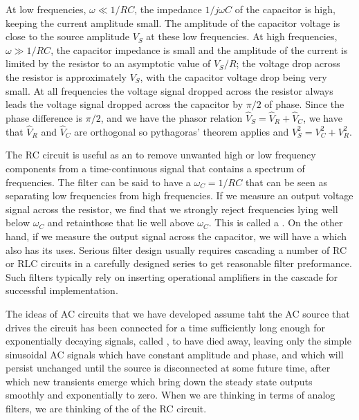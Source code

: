 \documentclass[12pt, a4paper, oneside, openright, titlepage]{book}
\begin{document}
At low frequencies, $\omega \ll 1/RC$, the impedance $1/j\omega C$ of the capacitor is high, keeping the current amplitude small. The amplitude of the capacitor voltage is close to the source amplitude $V_S$ at these low frequencies. At high frequencies, $\omega \gg 1/RC$, the capacitor impedance is small and the amplitude of the current is limited by the resistor to an asymptotic value of $V_S/R$; the voltage drop across the resistor is approximately $V_S$, with the capacitor voltage drop being very small. At all frequencies the voltage signal dropped across the resistor always leads the voltage signal dropped across the capacitor by $\pi/2$ of phase. Since the phase difference is $\pi/2$, and we have the phasor relation $\hat{V}_S = \hat{V}_R + \hat{V}_C$, we have that $\hat{V}_R$ and $\hat{V}_C$ are orthogonal so pythagoras' theorem applies and $V_S^2 = V_C^2+V_R^2$.

\begin{rmk}
    The RC circuit is useful as an  to remove unwanted high or low frequency components from a time-continuous signal that contains a spectrum of frequencies. The filter can be said to have a  $\omega_C = 1/RC$ that can be seen as separating low frequencies from high frequencies. If we measure an output voltage signal across the resistor, we find that we strongly reject frequencies lying well below $\omega_C$ and retainthose that lie well above $\omega_C$. This is called a . On the other hand, if we measure the output signal across the capacitor, we will have a  which also has its uses. Serious filter design usually requires cascading a number of RC or RLC circuits in a carefully designed series to get reasonable filter preformance. Such filters typically rely on inserting operational amplifiers in the cascade for successful implementation.
\end{rmk}

\begin{rmk}
    The ideas of AC circuits that we have developed assume taht the AC source that drives the circuit has been connected for a time sufficiently long enough for exponentially decaying signals, called , to have died away, leaving only the simple  sinusoidal AC signals which have constant amplitude and phase, and which will persist unchanged until the source is disconnected at some future time, after which new transients emerge which bring down the steady state outputs smoothly and exponentially to zero. When we are thinking in terms of analog filters, we are thinking of the  of the RC circuit.
\end{rmk}
\end{document}
